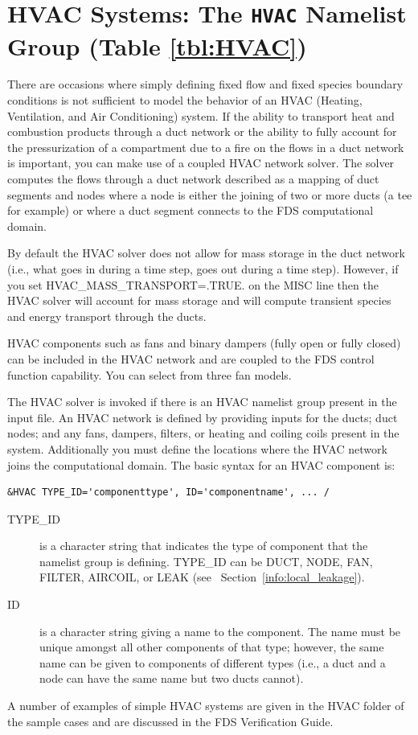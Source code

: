 \documentclass[11pt]{book}
\begin{document}
\section{HVAC Systems: The \texorpdfstring{{\tt HVAC}}{HVAC} Namelist Group (Table \ref{tbl:HVAC})}
\label{info:HVAC}

There are occasions where simply defining fixed flow and fixed species boundary conditions is not sufficient to model the behavior of an HVAC (Heating, Ventilation, and Air Conditioning) system.
If the ability to transport heat and combustion products through a duct network or the ability to fully account for the pressurization of a compartment
due to a fire on the flows in a duct network is important, you can make use of a coupled HVAC network solver.  The solver computes the flows through a
duct network described as a mapping of duct segments and nodes where a node is either the joining of two or more ducts (a tee for example) or where a duct segment connects to the FDS computational domain.

By default the HVAC solver does not allow for mass storage in the duct network (i.e., what goes in during a time step, goes out during a time step). However, if you set {\ct HVAC\_MASS\_TRANSPORT=.TRUE.} on the {\ct MISC} line then the HVAC solver will account for mass storage and will compute transient species and energy transport through the ducts.

HVAC components such as fans and binary dampers (fully open or fully closed) can be included in the HVAC network and are coupled to the FDS control function capability.  You can select from three fan models.

The HVAC solver is invoked if there is an {\ct HVAC} namelist group present in the input file.
An HVAC network is defined by providing inputs for the ducts; duct nodes; and any fans, dampers, filters, or heating and coiling coils present in the system.
Additionally you must define the locations where the HVAC network joins the computational domain.  The basic syntax for an {\ct HVAC} component is:

\begin{lstlisting}
&HVAC TYPE_ID='componenttype', ID='componentname', ... /
\end{lstlisting}


\begin{description}
\item[{\ct TYPE\_ID}] is a character string that indicates the type of component that the namelist group is defining.   {\ct TYPE\_ID} can be {\ct DUCT}, {\ct NODE}, {\ct FAN}, {\ct FILTER}, {\ct AIRCOIL}, or {\ct LEAK} (see ~Section~\ref{info:local_leakage}).
\item[{\ct ID}] is a character string giving a name to the component.  The name must be unique amongst all other components of that type; however, the same name can be given to components of different types (i.e., a duct and a node can have the same name but two ducts cannot).
\end{description}
A number of examples of simple HVAC systems are given in the HVAC folder of the sample cases and are discussed in the FDS Verification Guide.
\end{document}

